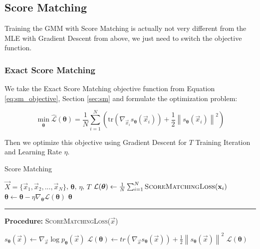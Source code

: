 \newpage
\subsection{Score Matching}
\label{sec:gmm_sm}

Training the GMM with Score Matching is actually not very different from the MLE with Gradient Descent from above, we just need 
to switch the objective function.  

\subsubsection{Exact Score Matching}

We take the Exact Score Matching objective function from Equation \ref{eq:sm_objective}, Section \ref{sec:sm} and formulate the optimization problem:

\begin{equation}
    \min_{\substack{\boldsymbol{\theta}}} \hat{\mathcal{L}}(\boldsymbol{\theta}) = \frac{1}{N} \sum_{i=1}^{N} \left(\text{tr} \left( \nabla_{\vec x_i} s_{\boldsymbol{\theta}}(\vec x_i) \right) + \frac{1}{2} \left\| s_{\boldsymbol{\theta}}(\vec x_i) \right\|^2 \right)
    \label{eq:sm_optimization_problem}
\end{equation}

Then we optimize this objective using Gradient Descent for $T$ Training Iteration and Learning Rate $\eta$.  

\begin{algorithm}
    \caption{Score Matching}
    \begin{algorithmic}[1]  
        \Require $\vec X = \{\vec x_1, \vec x_2, ..., \vec x_N\}$, $\boldsymbol{\theta}$, $\eta$, $T$
            \State $\mathcal{L}(\boldsymbol{\theta}) \gets \frac{1}{N} \sum_{i=1}^N \textsc{ScoreMatchingLoss}(\vec x_i)$
            \State $\boldsymbol{\theta} \gets \boldsymbol{\theta} - \eta \nabla_{\boldsymbol{\theta}} \mathcal{L}(\boldsymbol{\theta})$
        \EndFor
        \State \Return $\boldsymbol{\theta}$
        \end{algorithmic}
        \noindent\rule{\linewidth}{0.4pt}
        \textbf{Procedure:} \textsc{ScoreMatchingLoss}($\vec x$)
        \begin{algorithmic}[1]
            \State $s_{\boldsymbol{\theta}}(\vec x) \gets \nabla_{\vec x} \log p_{\boldsymbol{\theta}}(\vec x)$
            \State $\mathcal{L}(\boldsymbol{\theta}) \gets tr(\nabla_{\vec x} s_{\boldsymbol{\theta}}(\vec x)) + \frac{1}{2} \left\| s_{\boldsymbol{\theta}}(\vec x) \right\|^2 $
            \State \Return $\mathcal{L}(\boldsymbol{\theta})$
        \end{algorithmic}
\end{algorithm}

